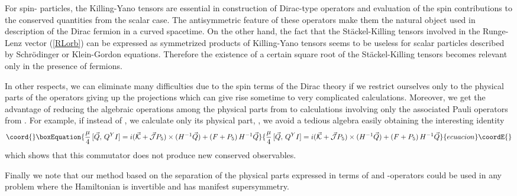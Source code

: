 \documentclass[a4paper,12pt]{article}
\begin{document}
For spin-\coordHE{} particles, the Killing-Yano tensors are essential 
in construction of Dirac-type operators and evaluation of the spin 
contributions to the conserved quantities from the scalar case.  The 
antisymmetric feature of these operators make them the natural object 
used in description of the Dirac fermion in a curved spacetime. On the 
other hand, the fact that the St\" ackel-Killing tensors involved in 
the Runge-Lenz vector (\ref{RLorb}) can be expressed as symmetrized 
products of Killing-Yano tensors seems to be useless for scalar 
particles described by Schr\" odinger or Klein-Gordon equations. 
Therefore the existence of a certain square root of the 
St\" ackel-Killing tensors becomes relevant only in the presence of 
fermions.

In other respects, we can eliminate many difficulties due to the spin terms 
of the Dirac theory if we restrict ourselves only to 
the physical parts \coordHE{} of the operators \coordHE{} giving up the 
projections \coordHE{}  which can give rise  sometime to 
very complicated calculations. Moreover, we get the advantage  
of reducing the algebraic operations among the physical parts from 
\coordHE{} to calculations involving only the associated Pauli operators 
from \coordHE{}. For example, if instead of \myHighlight{$[\vec{Q},\,Q^Y]$}\coordHE{}, we calculate 
only its physical part,  \coordHE{}, we avoid a tedious algebra
easily obtaining the interesting identity
\begin{equation}\coord{}\boxEquation{
\frac{\mu}{4}\,[\vec{Q},\,Q^YI]= i(\vec{\cal K}+\vec{\cal J}P_{5})\times 
(H^{-1}\vec{Q})  + (F+P_5)\,H^{-1}\vec{Q}
}{
\frac{\mu}{4}\,[\vec{Q},\,Q^YI]= i(\vec{\cal K}+\vec{\cal J}P_{5})\times 
(H^{-1}\vec{Q})  + (F+P_5)\,H^{-1}\vec{Q}
}{ecuacion}\coordE{}\end{equation}  
which shows that this commutator does not produce new conserved 
observables.

 
Finally we note that our method based on the separation of the 
physical parts expressed in terms of \coordHE{} and \coordHE{}-operators 
could be used in any problem where the Hamiltonian is invertible and has 
manifest supersymmetry.   
\end{document}
